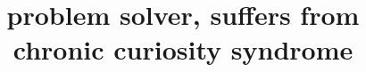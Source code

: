 \documentclass[11pt,a4paper,sans]{moderncv}                  %
\title{problem solver, suffers from chronic curiosity syndrome}
\begin{document}
\makecvtitle


\end{document}
